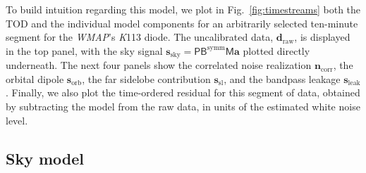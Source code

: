 \documentclass[twocolumn]{../../common/aa}
\def\WMAP{\emph{WMAP}}
\newcommand{\K}[0]{\textit K}
\begin{document}
To build intuition regarding this model, we plot in Fig.~\ref{fig:timestreams} both the TOD and the individual model components for an arbitrarily selected ten-minute segment for the \WMAP's \K113 diode. The uncalibrated data, $\boldsymbol d_\mathrm{raw}$, is displayed in the top panel, with the sky signal $\boldsymbol s_\mathrm{sky}=\mathsf P\mathsf B^\mathrm{symm}\mathsf M\boldsymbol a$ plotted directly underneath. The next four panels show the correlated noise realization $\boldsymbol n_\mathrm{corr}$, the orbital dipole $\boldsymbol s_\mathrm{orb}$, the far sidelobe contribution $\boldsymbol s_\mathrm{sl}$, and the bandpass leakage $\boldsymbol s_\mathrm{leak}$. Finally, we also plot the time-ordered residual for this segment of data, obtained by subtracting the model from the raw data, in units of the estimated white noise level. 


\subsection{Sky model}\label{subsec:sky_model}
\end{document}
